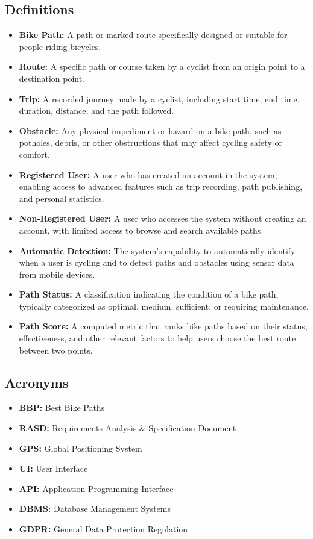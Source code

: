 \subsection{Definitions}
\label{subsec:definitions}%
\begin{itemize}
    \item \textbf{Bike Path:} A path or marked route specifically designed or suitable for people riding bicycles.
    \item \textbf{Route:} A specific path or course taken by a cyclist from an origin point to a destination point.
    \item \textbf{Trip:} A recorded journey made by a cyclist, including start time, end time, duration, distance, and the path followed.
    \item \textbf{Obstacle:} Any physical impediment or hazard on a bike path, such as potholes, debris, or other obstructions that may affect cycling safety or comfort.
    \item \textbf{Registered User:} A user who has created an account in the system, enabling access to advanced features such as trip recording, path publishing, and personal statistics.
    \item \textbf{Non-Registered User:} A user who accesses the system without creating an account, with limited access to browse and search available paths.
    \item \textbf{Automatic Detection:} The system's capability to automatically identify when a user is cycling and to detect paths and obstacles using sensor data from mobile devices.
    \item \textbf{Path Status:} A classification indicating the condition of a bike path, typically categorized as optimal, medium, sufficient, or requiring maintenance.
    \item \textbf{Path Score:} A computed metric that ranks bike paths based on their status, effectiveness, and other relevant factors to help users choose the best route between two points.
\end{itemize}

\subsection{Acronyms}
\label{subsec:acronyms}%
\begin{itemize}
    \item \textbf{BBP:} Best Bike Paths
    \item \textbf{RASD:} Requirements Analysis \& Specification Document
    \item \textbf{GPS:} Global Positioning System
    \item \textbf{UI:} User Interface
    \item \textbf{API:} Application Programming Interface
    \item \textbf{DBMS:} Database Management Systems
    \item \textbf{GDPR:} General Data Protection Regulation
\end{itemize}

